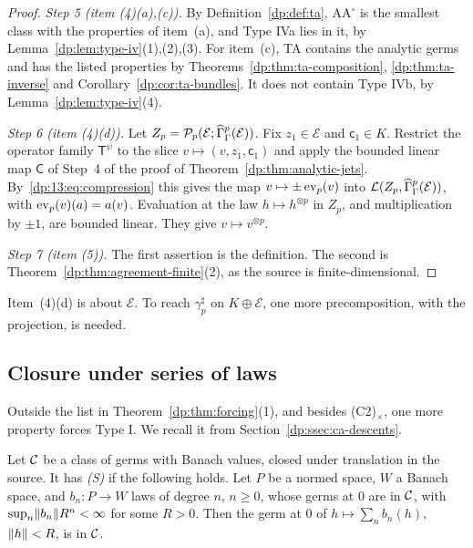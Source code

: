 \begin{proof}
\emph{Step 5 (item (4)(a),(c)).} By Definition~\ref{dp:def:ta}, $\mathrm{AA}^\circ$ is the smallest class with the properties of item~(a), and Type IVa lies in it, by Lemma~\ref{dp:lem:type-iv}(1),(2),(3). For item~(c), TA contains the analytic germs and has the listed properties by Theorems~\ref{dp:thm:ta-composition}, \ref{dp:thm:ta-inverse} and Corollary~\ref{dp:cor:ta-bundles}. It does not contain Type IVb, by Lemma~\ref{dp:lem:type-iv}(4).

\emph{Step 6 (item (4)(d)).} Let $Z_p=\mathcal P_p(\mathcal E;\widehat\Gamma^p_\Gamma(\mathcal E))$. Fix $z_1\in\mathcal E$ and $\mathsf c_1\in K$. Restrict the operator family $\mathsf T^\psi$ to the slice $v\mapsto(v,z_1,\mathsf c_1)$ and apply the bounded linear map $\mathsf C$ of Step~4 of the proof of Theorem~\ref{dp:thm:analytic-jets}. By~\eqref{dp:13:eq:compression} this gives the map $v\mapsto\pm\operatorname{ev}_p(v)$ into $\mathcal L(Z_p,\widehat\Gamma^p_\Gamma(\mathcal E))$, with $\operatorname{ev}_p(v)(a)=a(v)$. Evaluation at the law $h\mapsto h^{\otimes p}$ in $Z_p$, and multiplication by $\pm1$, are bounded linear. They give $v\mapsto v^{\otimes p}$.

\emph{Step 7 (item (5)).} The first assertion is the definition. The second is Theorem~\ref{dp:thm:agreement-finite}(2), as the source is finite-dimensional.
\end{proof}

Item~(4)(d) is about $\mathcal E$. To reach $\gamma^\sharp_p$ on $K\oplus\mathcal E$, one more precomposition, with the projection, is needed.

\subsection{Closure under series of laws}\label{dp:ssec:series}

Outside the list in Theorem~\ref{dp:thm:forcing}(1), and besides (C2)$_\times$, one more property forces Type I. We recall it from Section~\ref{dp:ssec:ca-descents}.

\begin{definition}\label{dp:def:s-axiom}
Let $\mathcal{C}$ be a class of germs with Banach values, closed under translation in the source. It has \emph{\textup{(S)}} if the following holds. Let $P$ be a normed space, $W$ a Banach space, and $b_n\colon P\to W$ laws of degree $n$, $n\ge0$, whose germs at $0$ are in $\mathcal{C}$, with $\sup_n\lVert b_n\rVert R^n<\infty$ for some $R>0$. Then the germ at $0$ of $h\mapsto\sum_nb_n(h)$, $\lVert h\rVert<R$, is in $\mathcal{C}$.
\end{definition}

